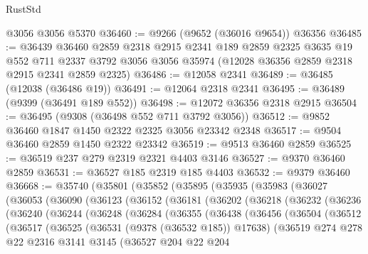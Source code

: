 \begin{lexlean}{RustStd}
\begin{coremodule}
    @3056
    @3056
    @5370
@36460 := @9266 (@9652 (@36016 @9654)) @36356
@36485 := @36439
    @36460
    @2859
    @2318
    @2915
    @2341
    @189
    @2859
    @2325
    @3635
    @19
    @552
    @711
    @2337
    @3792
    @3056
    @3056
    @35974
    (@12028 @36356 @2859 @2318 @2915 @2341 @2859 @2325)
@36486 := @12058 @2341
@36489 := @36485 (@12038 (@36486 @19))
@36491 := @12064 @2318 @2341
@36495 := @36489 (@9399 (@36491 @189 @552))
@36498 := @12072 @36356 @2318 @2915
@36504 := @36495 (@9308 (@36498 @552 @711 @3792 @3056))
@36512 := @9852 @36460 @1847 @1450 @2322 @2325 @3056 @23342 @2348
@36517 := @9504 @36460 @2859 @1450 @2322 @23342
@36519 := @9513 @36460 @2859
@36525 := @36519 @237 @279 @2319 @2321 @4403 @3146
@36527 := @9370 @36460 @2859
@36531 := @36527 @185 @2319 @185 @4403
@36532 := @9379 @36460
@36668 := @35740
    (@35801
      (@35852
        (@35895
          (@35935
            (@35983
              (@36027
                (@36053
                  (@36090
                    (@36123
                      (@36152
                        (@36181
                          (@36202
                            (@36218
                              (@36232
                                (@36236
                                  (@36240
                                    (@36244
                                      (@36248
                                        (@36284
                                          (@36355
                                            (@36438
                                              (@36456
                                                (@36504
                                                  (@36512
                                                    (@36517
                                                      (@36525
                                                        (@36531 (@9378 (@36532 @185)) @17638)
                                                        (@36519
                                                          @274
                                                          @278
                                                          @22
                                                          @2316
                                                          @3141
                                                          @3145
                                                          (@36527
                                                            @204
                                                            @22
                                                            @204

\end{coremodule}
\end{lexlean}
